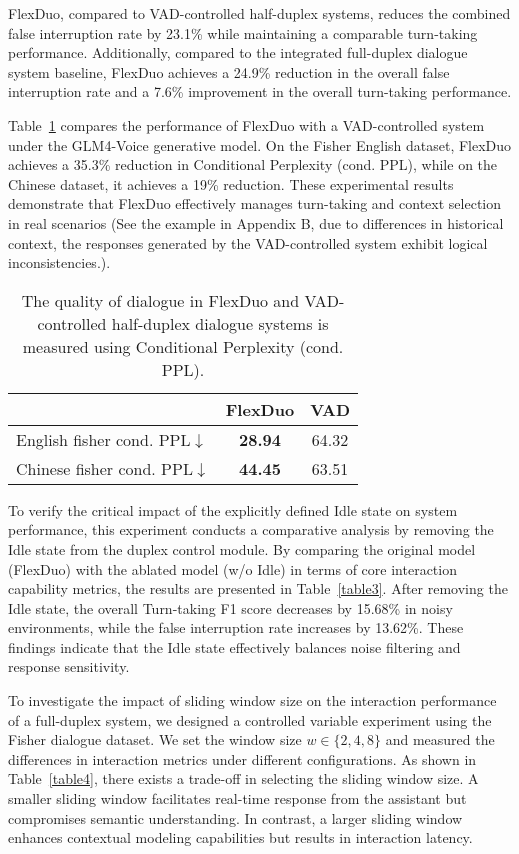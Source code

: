 \documentclass[11pt]{article}
\begin{document}
FlexDuo, compared to VAD-controlled half-duplex systems, reduces the combined false interruption rate by 23.1\% while maintaining a comparable turn-taking performance. Additionally, compared to the integrated full-duplex dialogue system baseline, FlexDuo achieves a 24.9\% reduction in the overall false interruption rate and a 7.6\% improvement in the overall turn-taking performance.

Table~\ref{table2} compares the performance of FlexDuo with a VAD-controlled system under the GLM4-Voice generative model. On the Fisher English dataset, FlexDuo achieves a 35.3\% reduction in Conditional Perplexity (cond. PPL), while on the Chinese dataset, it achieves a 19\% reduction. These experimental results demonstrate that FlexDuo effectively manages turn-taking and context selection in real scenarios (See the example in Appendix B, due to differences in historical context, the responses generated by the VAD-controlled system exhibit logical inconsistencies.).

\begin{table}
  \centering
  \small
  \begin{tabular}{lcc}
    \toprule
    & \textbf{FlexDuo} 
    & \textbf{VAD}\\
    \midrule
    English fisher cond. PPL$\downarrow$   & \textbf{28.94} &  64.32 \\
    Chinese fisher cond. PPL$\downarrow$ & \textbf{44.45} & 63.51\\
    \bottomrule
  \end{tabular}
  \caption{\label{table2}
    The quality of dialogue in FlexDuo and VAD-controlled half-duplex dialogue systems is measured using Conditional Perplexity (cond. PPL).
  }
\end{table}


To verify the critical impact of the explicitly defined Idle state on system performance, this experiment conducts a comparative analysis by removing the Idle state from the duplex control module. By comparing the original model (FlexDuo) with the ablated model (w/o Idle) in terms of core interaction capability metrics, the results are presented in Table~\ref{table3}. After removing the Idle state, the overall Turn-taking F1 score decreases by 15.68\% in noisy environments, while the false interruption rate increases by 13.62\%. These findings indicate that the Idle state effectively balances noise filtering and response sensitivity.


To investigate the impact of sliding window size on the interaction performance of a full-duplex system, we designed a controlled variable experiment using the Fisher dialogue dataset. We set the window size $w \in \{2, 4, 8\}$ and measured the differences in interaction metrics under different configurations. As shown in Table~\ref{table4}, there exists a trade-off in selecting the sliding window size. A smaller sliding window facilitates real-time response from the assistant but compromises semantic understanding. In contrast, a larger sliding window enhances contextual modeling capabilities but results in interaction latency.
\end{document}
